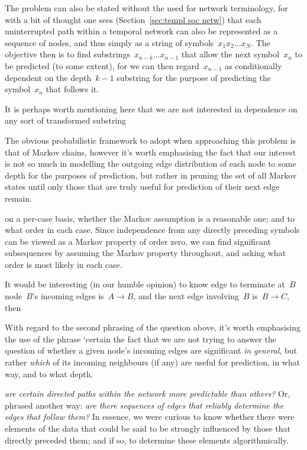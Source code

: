\documentclass[12pt,a4paper]{article}
\begin{document}
The problem can also be stated without the need for network terminology, for
with a bit of thought one sees (Section~\ref{sec:templ soc netw}) that each
uninterrupted path within a temporal network can also be represented as a
sequence of nodes, and thus simply as a string of symbols~$x_1 x_2 \dots x_N$.
The objective then is to find substrings~$x_{n-k} \dots x_{n-1}$ that allow the
next symbol~$x_n$ to be predicted (to some extent), for we can then
regard~$x_{n-1}$ as conditionally dependent on the depth~$k-1$ substring for the
purpose of predicting the symbol~$x_n$ that follows it.

It is perhaps worth mentioning here that we are not interested in dependence on
any sort of transformed substring

The obvious probabilistic framework to adopt when approaching this problem is
that of Markov chains, however it's worth emphasising the fact that our interest
is not so much in modelling the outgoing edge distribution of each node to some
depth for the purposes of prediction, but rather in pruning the set of all
Markov states until only those that are truly useful for prediction of their
next edge remain.

on a per-case basis, whether the Markov assumption is a reasonable one; and to
what order in each case. Since independence from any directly preceding symbols
can be viewed as a Markov property of order zero, we can find significant
subsequences by assuming the Markov property throughout, and asking what order
is most likely in each case.





It would be interesting (in our humble opinion) to
know edge to terminate at~$B$ node~$B$'s incoming edges is~$A \longrightarrow
B$, and the next edge involving~$B$ is~$B \longrightarrow C$, then 

With regard to the second phrasing of the question above, it's worth emphasising
the use of the phrase `certain the fact that we are not trying to answer the question of whether a given node's
incoming edges are significant \emph{in general}, but rather \emph{which} of its
incoming neighbours (if any) are useful for prediction, in what way, and to what
depth.


\textit{are certain directed paths
within the network more predictable than others?} Or, phrased another way:
\textit{are there sequences of edges that reliably determine the edges that
follow them?} In essence, we were curious to know whether there were elements of
the data that could be said to be strongly influenced by those that directly
preceded them; and if so, to determine these elements algorithmically.
\end{document}
